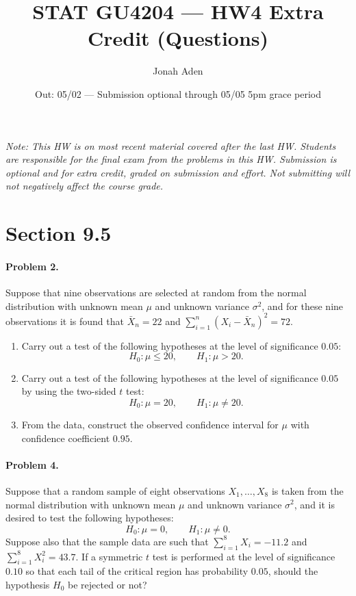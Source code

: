 \documentclass[11pt]{article}
\title{STAT GU4204 --- HW4 Extra Credit (Questions)}
\author{Jonah Aden}
\date{Out: 05/02 --- Submission optional through 05/05 5pm grace period}
\begin{document}
\maketitle

\noindent\textit{Note: This HW is on most recent material covered after the last HW.
Students are responsible for the final exam from the problems in this HW.
Submission is optional and for extra credit, graded on submission and effort.
Not submitting will not negatively affect the course grade.}

\bigskip

\section*{Section 9.5}

\paragraph{Problem 2.}
Suppose that nine observations are selected at random from the normal distribution
with unknown mean $\mu$ and unknown variance $\sigma^2$, and for these nine
observations it is found that $\bar{X}_n = 22$ and
$\sum_{i=1}^{n}(X_i - \bar{X}_n)^2 = 72$.
\begin{enumerate}[label=(\alph*)]
    \item Carry out a test of the following hypotheses at the level of significance $0.05$:
    \[
        H_0\colon \mu \leq 20, \qquad H_1\colon \mu > 20.
    \]
    \item Carry out a test of the following hypotheses at the level of significance $0.05$
    by using the two-sided $t$ test:
    \[
        H_0\colon \mu = 20, \qquad H_1\colon \mu \neq 20.
    \]
    \item From the data, construct the observed confidence interval for $\mu$ with
    confidence coefficient $0.95$.
\end{enumerate}

\paragraph{Problem 4.}
Suppose that a random sample of eight observations $X_1, \dots, X_8$ is taken from
the normal distribution with unknown mean $\mu$ and unknown variance $\sigma^2$,
and it is desired to test the following hypotheses:
\[
    H_0\colon \mu = 0, \qquad H_1\colon \mu \neq 0.
\]
Suppose also that the sample data are such that $\sum_{i=1}^{8} X_i = -11.2$ and
$\sum_{i=1}^{8} X_i^2 = 43.7$. If a symmetric $t$ test is performed at the level of
significance $0.10$ so that each tail of the critical region has probability $0.05$,
should the hypothesis $H_0$ be rejected or not?
\end{document}
